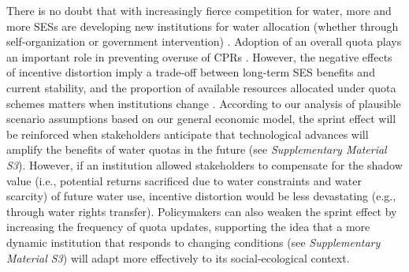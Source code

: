 \documentclass{article}
\begin{document}
There is no doubt that with increasingly fierce competition for water, more and more SESs are developing new institutions for water allocation (whether through self-organization or government intervention) \cite{anderssonVoluntaryleadershipemergence2020, wutichWaterScarcitySustainability2009}.
Adoption of an overall quota plays an important role in preventing overuse of CPRs \cite{tilmanLocalizedprosocialpreferences2019}.
However, the negative effects of incentive distortion imply a trade-off between long-term SES benefits and current stability, and the proportion of available resources allocated under quota schemes matters when institutions change \cite{ladeRegimeshiftssocialecological2013}.
According to our analysis of plausible scenario assumptions based on our general economic model, the sprint effect will be reinforced when stakeholders anticipate that technological advances will amplify the benefits of water quotas in the future (see \textit{Supplementary Material S3}).
However, if an institution allowed stakeholders to compensate for the shadow value (i.e., potential returns sacrificed due to water constraints and water scarcity) \cite{howarthAccountingvalueecosystem2002} of future water use, incentive distortion would be less devastating (e.g., through water rights transfer).
Policymakers can also weaken the sprint effect by increasing the frequency of quota updates, supporting the idea that a more dynamic institution that responds to changing conditions (see \textit{Supplementary Material S3}) will adapt more effectively to its social-ecological context.
\end{document}
